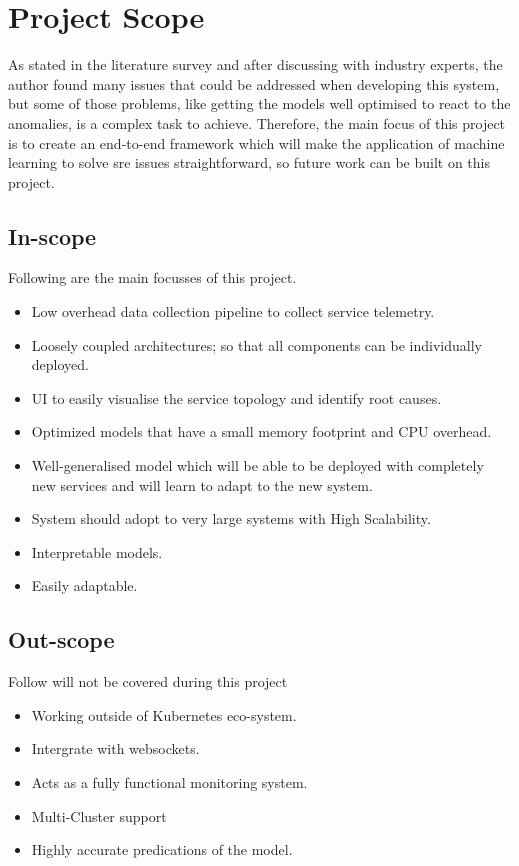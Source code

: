 \section{Project Scope}

As stated in the literature survey and after discussing with industry experts, the author found many issues that could be addressed when developing this system, but some of those problems, like getting the models well optimised to react to the anomalies, is a complex task to achieve. 
Therefore, the main focus of this project is to create an end-to-end framework which will make the application of machine learning to solve \ac{sre} issues straightforward, so future work can be built on this project.

\subsection{In-scope} \label{sec:in-scope}
Following are the main focusses of this project.
\begin{itemize}[noitemsep,nolistsep] 
    \item Low overhead data collection pipeline to collect service telemetry.
    \item Loosely coupled architectures; so that all components can be individually deployed.
    \item UI to easily visualise the service topology and identify root causes.
    \item Optimized models that have a small memory footprint and CPU overhead.
    \item Well-generalised model which will be able to be deployed with completely new services and will learn to adapt to the new system.
    \item System should adopt to very large systems with High Scalability.
    \item Interpretable models.
    \item Easily adaptable.
\end{itemize}


\subsection{Out-scope} \label{sec:out-scope}
Follow will not be covered during this project
\begin{itemize}[noitemsep,nolistsep]
    \item Working outside of Kubernetes eco-system.
    \item Intergrate with websockets.
    \item Acts as a fully functional monitoring system.
    \item Multi-Cluster support
    \item Highly accurate predications of the model.
\end{itemize}

